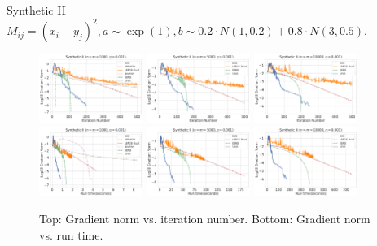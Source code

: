 \begin{frame}{Synthetic II}
    $M_{ij} = (x_i-y_j)^2, a \sim \exp(1), b\sim 0.2\cdot N(1, 0.2) + 0.8 \cdot N(3, 0.5).$

    \begin{figure}
        \centering
        \includegraphics[width=0.3\textwidth]{save/Synthetic II/iterations/n=1000, m=1000, reg=0.001}
        \includegraphics[width=0.3\textwidth]{save/Synthetic II/iterations/n=5000, m=5000, reg=0.001}
        \includegraphics[width=0.3\textwidth]{save/Synthetic II/iterations/n=10000, m=10000, reg=0.001} \\
        \includegraphics[width=0.3\textwidth]{save/Synthetic II/run_times/n=1000, m=1000, reg=0.001}
        \includegraphics[width=0.3\textwidth]{save/Synthetic II/run_times/n=5000, m=5000, reg=0.001}
        \includegraphics[width=0.3\textwidth]{save/Synthetic II/run_times/n=10000, m=10000, reg=0.001}
        \caption{Top: Gradient norm vs. iteration number. Bottom: Gradient norm vs. run time.}
        \label{fig:synthetic_2}
    \end{figure}
\end{frame}

